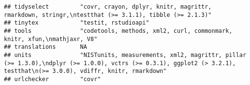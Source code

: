 \documentclass[
]{article}
\begin{document}
\begin{verbatim}
## tidyselect         "covr, crayon, dplyr, knitr, magrittr, rmarkdown, stringr,\ntestthat (>= 3.1.1), tibble (>= 2.1.3)"                                                                                                                                                                                                                                                                                                                                                                               
## tinytex            "testit, rstudioapi"                                                                                                                                                                                                                                                                                                                                                                                                                                                              
## tools              "codetools, methods, xml2, curl, commonmark, knitr, xfun,\nmathjaxr, V8"                                                                                                                                                                                                                                                                                                                                                                                                          
## translations       NA                                                                                                                                                                                                                                                                                                                                                                                                                                                                                
## units              "NISTunits, measurements, xml2, magrittr, pillar (>= 1.3.0),\ndplyr (>= 1.0.0), vctrs (>= 0.3.1), ggplot2 (> 3.2.1), testthat\n(>= 3.0.0), vdiffr, knitr, rmarkdown"                                                                                                                                                                                                                                                                                                              
## urlchecker         "covr"                                                                                                                                                                                                                                                                                                                                                                                                                                                                            

\end{verbatim}
\end{document}
